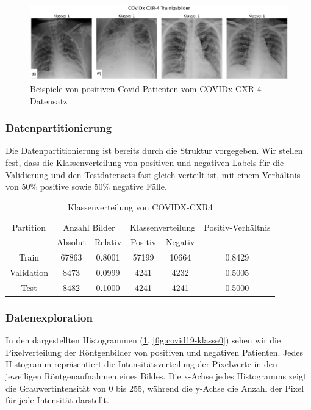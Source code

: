\begin{figure}[H]
    \centering
    \includegraphics[width=\linewidth]{01-images/03-data/covid19-klasse1.png}
    \caption{Beispiele von positiven Covid Patienten vom COVIDx CXR-4 Datensatz}
    \label{fig:covid19-klasse1}
\end{figure}


\subsubsection{Datenpartitionierung} \label{chap:COVIDX-Partition}

Die Datenpartitionierung ist bereits durch die Struktur vorgegeben. Wir stellen fest, dass die Klassenverteilung von positiven und negativen Labels für die Validierung und den Testdatensets fast gleich verteilt ist, mit einem Verhältnis von 50\% positive sowie 50\% negative Fälle. 

\begin{table}[h]
\centering
\begin{tabular}{@{}cccccc@{}}
\toprule
Partition & \multicolumn{2}{c}{Anzahl Bilder} & \multicolumn{2}{c}{Klassenverteilung} & Positiv-Verhältnis\\ 
\cmidrule(lr){2-3} \cmidrule(lr){4-5} 
          & Absolut & Relativ & Positiv & Negativ & \\ 
\midrule
Train      & 67863 & 0.8001 & 57199 & 10664 & 0.8429 \\
Validation & 8473  & 0.0999 & 4241  & 4232  & 0.5005 \\
Test       & 8482  & 0.1000 & 4241  & 4241  & 0.5000 \\ 
\bottomrule
\end{tabular}
\caption{Klassenverteilung von COVIDX-CXR4}
\label{tab:covidx-klassenverteilung}
\end{table}

\subsubsection{Datenexploration}


In den dargestellten Histogrammen (\ref{fig:covid19-klasse1}, \ref{fig:covid19-klasse0}) sehen wir die Pixelverteilung der Röntgenbilder von positiven und negativen Patienten. Jedes Histogramm repräsentiert die Intensitätsverteilung der Pixelwerte in den jeweiligen Röntgenaufnahmen eines Bildes. Die x-Achse jedes Histogramms zeigt die Grauwertintensität von 0 bis 255, während die y-Achse die Anzahl der Pixel für jede Intensität darstellt. 


